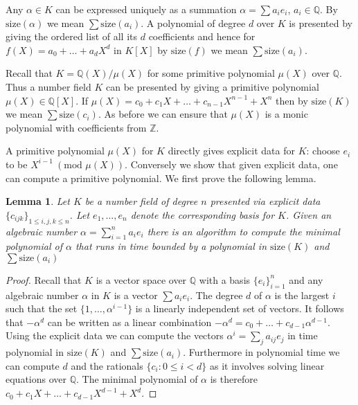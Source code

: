 \documentclass[11pt]{madras}%
\newtheorem{lemma}[theorem]{Lemma}
\theoremstyle{remark}
\newcommand{\size}[1]{{\ensuremath{\mathrm{size}\left(#1\right)}}}
\begin{document}
Any $\alpha \in K$ can be expressed uniquely as a summation $\alpha =
\sum a_i e_i$, $a_i \in \mathbb{Q}$.  By $\size{\alpha}$ we mean $\sum
\size{a_i}$. A polynomial of degree $d$ over $K$ is presented by
giving the ordered list of all its $d$ coefficients and hence for
$f(X) = a_0 + \ldots + a_d X^d$ in $K[X]$ by $\size{f}$ we mean $\sum
\size{a_i}$.


Recall that $K = \mathbb{Q}(X)/\mu(X)$ for some primitive polynomial
$\mu(X)$ over $\mathbb{Q}$.  Thus a number field $K$ can be presented
by giving a primitive polynomial $\mu(X) \in \mathbb{Q}[X]$.  If
$\mu(X) = c_0 + c_1 X + \ldots + c_{n-1} X^{n-1} + X^n$ then by
$\size{K}$ we mean $\sum \size{c_i}$.  As before we can ensure that
$\mu(X)$ is a monic polynomial with coefficients from $\mathbb{Z}$.

A primitive polynomial $\mu(X)$ for $K$ directly gives explicit data
for $K$: choose $e_i$ to be $X^{i-1}\ (\textrm{mod } \mu(X))$.
Conversely we show that given explicit data, one can compute a
primitive polynomial.  We first prove the following lemma.

\begin{lemma}\label{lem-compute-minpoly}
  Let $K$ be a number field of degree $n$ presented via explicit data
  $\{ c_{ijk}\}_{1 \leq i,j,k \leq n}$.  Let $e_1,\ldots,e_n$ denote
  the corresponding basis for $K$.  Given an algebraic number $\alpha
  = \sum_{i = 1}^n a_i e_i$ there is an algorithm to compute the
  minimal polynomial of $\alpha$ that runs in time bounded by a
  polynomial in $\size{K}$ and $\sum \size{a_i}$
\end{lemma}
\begin{proof}
  Recall that $K$ is a vector space over $\mathbb{Q}$ with a basis
  $\{e_i\}_{i=1}^n$ and any algebraic number $\alpha$ in $K$ is a
  vector $\sum a_i e_i$.  The degree $d$ of $\alpha$ is the largest
  $i$ such that the set $\{1,\ldots,\alpha^{i-1}\}$ is a linearly
  independent set of vectors.  It follows that $-\alpha^d$ can be
  written as a linear combination $- \alpha^d = c_0 + \ldots + c_{d-1}
  \alpha^{d-1}$.  Using the explicit data we can compute the vectors
  $\alpha^i = \sum_{j} a_{ij} e_j$ in time polynomial in $\size{K}$
  and $\sum \size{a_i}$.  Furthermore in polynomial time we can
  compute $d$ and the rationals $\{ c_i : 0 \leq i < d \}$ as it
  involves solving linear equations over $\mathbb{Q}$.  The minimal
  polynomial of $\alpha$ is therefore $c_0 + c_1 X + \ldots + c_{d-1}
  X^{d-1} + X^d$.
\end{proof}
\end{document}

